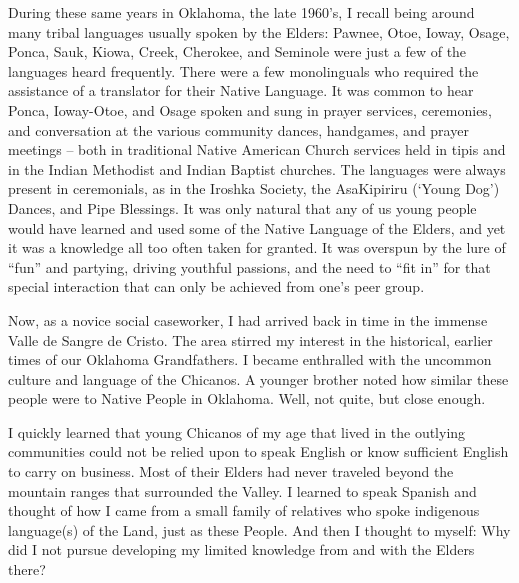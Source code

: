 \documentclass[output=paper]{LSP/langsci}
\begin{document}
During these same years in Oklahoma, the late 1960's, I recall being around many tribal languages usually spoken by the Elders: Pawnee, Otoe, Ioway, O\-sage, Ponca, Sauk, Kiowa, Creek, Cherokee, and Seminole were just a few of the languages heard frequently. There were a few monolinguals who required the assistance of a translator for their Native Language. It was common to hear Ponca, Ioway-Otoe, and Osage spoken and sung in prayer services, ceremonies, and conversation at the various community dances, handgames, and prayer meetings -- both in traditional Native American Church services held in tipis and in the Indian Methodist and Indian Baptist churches. The languages were always present in ceremonials, as in the Iroshka Society, the AsaKipiriru (`Young Dog') Dances, and Pipe Blessings. It was only natural that any of us young people would have learned and used some of the Native Language of the Elders, and yet it was a knowledge all too often taken for granted. It was overspun by the lure of ``fun'' and partying, driving youthful passions, and the need to ``fit in'' for that special interaction that can only be achieved from one's peer group.

Now, as a novice social caseworker, I had arrived back in time in the immense Valle de Sangre de Cristo. The area stirred my interest in the historical, earlier times of our Oklahoma Grandfathers. I became enthralled with the uncommon culture and language of the Chicanos. A younger brother noted how similar these people were to Native People in Oklahoma. Well, not quite, but close enough.

I quickly learned that young Chicanos of my age that lived in the outlying communities could not be relied upon to speak English or know sufficient English to carry on business. Most of their Elders had never traveled beyond the mountain ranges that surrounded the Valley. I learned to speak Spanish and thought of how I came from a small family of relatives who spoke indigenous language(s) of the Land, just as these People. And then I thought to myself: Why did I not pursue developing my limited knowledge from and with the Elders there?
\end{document}
